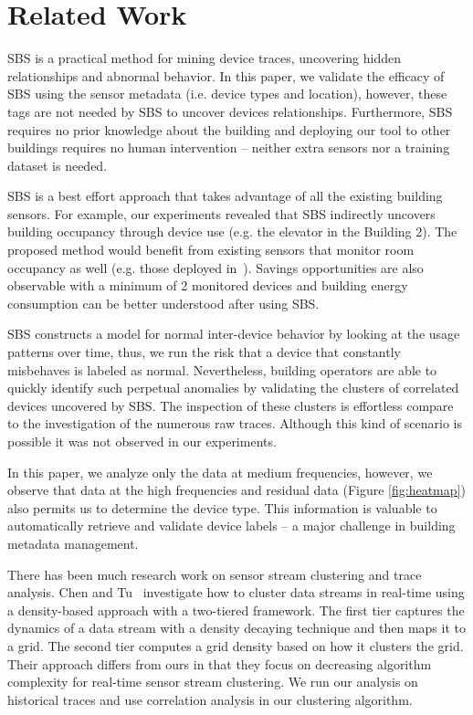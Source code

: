 \section{Related Work}

SBS is a practical method for mining device traces, uncovering hidden relationships and abnormal behavior. 
In this paper, we validate the efficacy of SBS using the sensor metadata (i.e. device types and location), however, these 
tags are not needed by SBS to uncover devices relationships.
Furthermore, SBS requires no prior knowledge about the building and deploying our tool to other buildings requires no human intervention --
neither extra sensors nor a training dataset is needed. 

SBS is a best effort approach that takes advantage of all the existing building sensors.
For example, our experiments revealed that SBS indirectly uncovers building occupancy through device use (e.g. the elevator in the Building 2). 
The proposed method would benefit from existing sensors that monitor room occupancy as well (e.g. those deployed in~\cite{agarwal:ipsn2011,erickson:ipsn2011}).  %
Savings opportunities are also observable with a minimum of 2 monitored devices and building energy consumption can be better understood after using SBS.

SBS constructs a model for normal inter-device behavior by looking at the usage patterns over time, thus, we run the risk that
a device that constantly misbehaves is labeled as normal.  %
Nevertheless, building operators are able to quickly identify such perpetual anomalies by validating the clusters of correlated devices uncovered by SBS.
The inspection of these clusters is effortless compare to the investigation of the numerous raw traces.  
Although this kind of scenario is possible it was not observed in our experiments.

In this paper, we analyze only the data at medium frequencies, however, we observe that data at the high frequencies and residual data (Figure \ref{fig:heatmap}) also permits us to determine the device type.  %
This information is valuable to automatically retrieve and validate device labels -- a major challenge in building metadata
management.

There has been much research work on sensor stream clustering and trace analysis. Chen and Tu~\cite{DStream} investigate 
how to cluster data streams in real-time using a density-based approach with a two-tiered framework. The first tier captures 
the dynamics of a data stream with a density decaying technique and then maps it to a grid.  The second tier computes a grid 
density based on how it clusters the grid. Their approach differs from ours in that they focus on decreasing algorithm 
complexity for real-time sensor stream clustering.  We run our analysis on historical traces and use correlation analysis
in our clustering algorithm.


